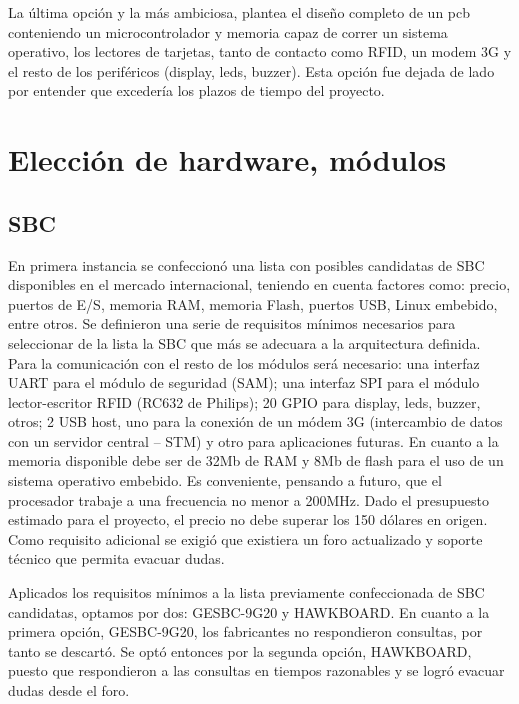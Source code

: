 La última opción y la más ambiciosa, plantea el diseño completo de un pcb conteniendo un microcontrolador y memoria capaz de correr un sistema operativo, los lectores de tarjetas, tanto de contacto como RFID, un modem 3G y el resto de los periféricos (display, leds, buzzer). Esta opción fue dejada de lado por entender que excedería los plazos de tiempo del proyecto.


\section{Elecci\'on de hardware, m\'odulos}

\subsection{SBC}
En primera instancia se confeccionó una lista con posibles candidatas de SBC disponibles en el mercado internacional, teniendo en cuenta factores como: precio, puertos de E/S, memoria RAM, memoria Flash, puertos USB, Linux embebido, entre otros.
Se definieron una serie de requisitos mínimos necesarios para seleccionar de la lista la SBC que más se adecuara a la arquitectura definida.
Para la comunicación con el resto de los módulos será necesario: una interfaz UART para el módulo de seguridad (SAM); una interfaz SPI para el módulo lector-escritor RFID (RC632 de Philips); 20 GPIO para display, leds, buzzer, otros; 2 USB host, uno para la conexión de un módem 3G (intercambio de datos con un servidor central – STM) y otro para aplicaciones futuras. En cuanto a la memoria disponible debe ser de 32Mb de RAM y 8Mb de flash para el uso de un sistema operativo embebido. Es conveniente, pensando a futuro, que el procesador trabaje a una frecuencia no menor a 200MHz.
Dado el presupuesto estimado para el proyecto, el precio no debe superar los 150 dólares en origen.
Como requisito adicional se exigió que existiera un foro actualizado y soporte técnico que permita evacuar dudas.



Aplicados los requisitos mínimos a la lista previamente confeccionada de SBC candidatas, optamos por dos: GESBC-9G20 y HAWKBOARD.
En cuanto a la primera opción, GESBC-9G20, los fabricantes no respondieron consultas, por tanto se descartó. Se optó entonces por la segunda opción, HAWKBOARD, puesto que respondieron a las consultas en tiempos razonables y se logró evacuar dudas desde el foro.


